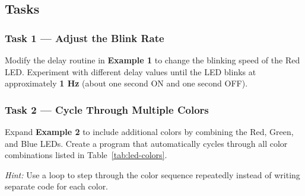 \subsection{Tasks}

\subsubsection{Task 1 — Adjust the Blink Rate}
Modify the delay routine in \textbf{Example 1} to change the blinking speed of the Red LED.  
Experiment with different delay values until the LED blinks at approximately \textbf{1 Hz} (about one second ON and one second OFF).

\medskip

\subsubsection{Task 2 — Cycle Through Multiple Colors}
Expand \textbf{Example 2} to include additional colors by combining the Red, Green, and Blue LEDs.  
Create a program that automatically cycles through all color combinations listed in Table~\ref{tab:led-colors}. \\

\smallskip

\noindent\textit{Hint:} Use a loop to step through the color sequence repeatedly instead of writing separate code for each color.
